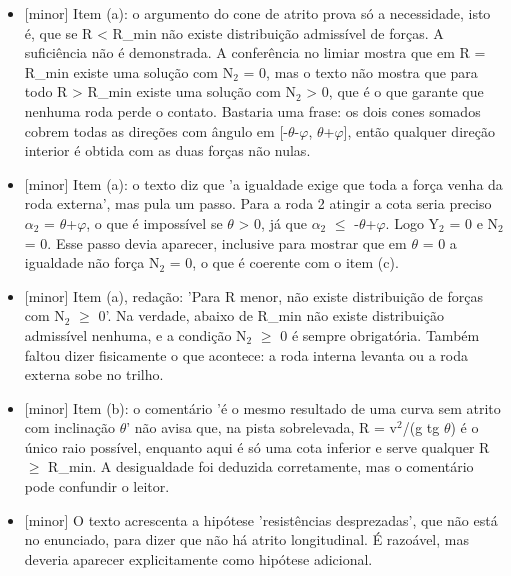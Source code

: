 \documentclass{article}%
\begin{document}
\begin{itemize}%
\item%
{[}minor{]} Item (a): o argumento do cone de atrito prova só a necessidade, isto é, que se R < R\_min não existe distribuição admissível de forças. A suficiência não é demonstrada. A conferência no limiar mostra que em R = R\_min existe uma solução com N$_{2}$ = 0, mas o texto não mostra que para todo R > R\_min existe uma solução com N$_{2}$ > 0, que é o que garante que nenhuma roda perde o contato. Bastaria uma frase: os dois cones somados cobrem todas as direções com ângulo em {[}-$\theta$-$\varphi$, $\theta$+$\varphi${]}, então qualquer direção interior é obtida com as duas forças não nulas.%
\item%
{[}minor{]} Item (a): o texto diz que 'a igualdade exige que toda a força venha da roda externa', mas pula um passo. Para a roda 2 atingir a cota seria preciso $\alpha$$_{2}$ = $\theta$+$\varphi$, o que é impossível se $\theta$ > 0, já que $\alpha$$_{2}$ $\leq$ -$\theta$+$\varphi$. Logo Y$_{2}$ = 0 e N$_{2}$ = 0. Esse passo devia aparecer, inclusive para mostrar que em $\theta$ = 0 a igualdade não força N$_{2}$ = 0, o que é coerente com o item (c).%
\item%
{[}minor{]} Item (a), redação: 'Para R menor, não existe distribuição de forças com N$_{2}$ $\geq$ 0'. Na verdade, abaixo de R\_min não existe distribuição admissível nenhuma, e a condição N$_{2}$ $\geq$ 0 é sempre obrigatória. Também faltou dizer fisicamente o que acontece: a roda interna levanta ou a roda externa sobe no trilho.%
\item%
{[}minor{]} Item (b): o comentário 'é o mesmo resultado de uma curva sem atrito com inclinação $\theta$' não avisa que, na pista sobrelevada, R = v$^2$/(g tg $\theta$) é o único raio possível, enquanto aqui é só uma cota inferior e serve qualquer R $\geq$ R\_min. A desigualdade foi deduzida corretamente, mas o comentário pode confundir o leitor.%
\item%
{[}minor{]} O texto acrescenta a hipótese 'resistências desprezadas', que não está no enunciado, para dizer que não há atrito longitudinal. É razoável, mas deveria aparecer explicitamente como hipótese adicional.%
\end{itemize}%
\end{document}
